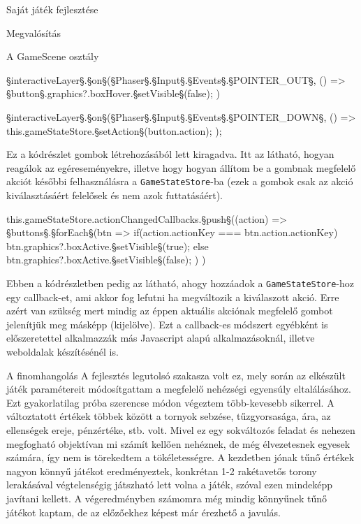 \begin{MyChapter}{Saját játék fejlesztése}
\begin{MySection}{Megvalósítás}
\begin{MySubSection}{A GameScene osztály}
\begin{javascript}
{	§\color{jsConst}interactiveLayer§.§\color{jsMethod}on§(§\color{jsType}Phaser§.§\color{jsType}Input§.§\color{jsType}Events§.§\color{jsConst}POINTER\_OUT§, () => {
		§\color{jsConst}button§.graphics?.boxHover.§\color{jsMethod}setVisible§(false);
	})
	
	§\color{jsConst}interactiveLayer§.§\color{jsMethod}on§(§\color{jsType}Phaser§.§\color{jsType}Input§.§\color{jsType}Events§.§\color{jsConst}POINTER\_DOWN§, () => {
		this.gameStateStore.§\color{jsMethod}setAction§(button.action);
	});
}
			\end{javascript}
			Ez a kódrészlet gombok létrehozásából lett kiragadva. Itt az látható, hogyan reagálok az egéreseményekre, illetve hogy hogyan állítom be a gombnak megfelelő akciót későbbi felhasználásra a \texttt{GameStateStore}-ba (ezek a gombok csak az akció kiválasztásáért felelősek és nem azok futtatásáért).
			\begin{javascript}
this.gameStateStore.actionChangedCallbacks.§\color{jsMethod}push§((action) => {
	§\color{jsConst}buttons§.§\color{jsMethod}forEach§(btn => {
		if(action.actionKey === btn.action.actionKey) {
			btn.graphics?.boxActive.§\color{jsMethod}setVisible§(true);
		} else {
			btn.graphics?.boxActive.§\color{jsMethod}setVisible§(false);
		}
	})
})
			\end{javascript}
			Ebben a kódrészletben pedig az látható, ahogy hozzáadok a \texttt{GameStateStore}-hoz egy callback-et, ami akkor fog lefutni ha megváltozik a kiválaszott akció. Erre azért van szükség mert mindig az éppen aktuális akciónak megfelelő gombot jelenítjük meg másképp (kijelölve). Ezt a callback-es módszert egyébként is előszeretettel alkalmazzák más Javascript alapú alkalmazásoknál, illetve weboldalak készítésénél is.
		\end{MySubSection}
		
		\begin{MySubSection}{A finomhangolás}
			A fejlesztés legutolsó szakasza volt ez, mely során az elkészült játék paramétereit módosítgattam a megfelelő nehézségi egyensúly eltalálásához. Ezt gyakorlatilag próba szerencse módon végeztem több-kevesebb sikerrel. A változtatott értékek többek között a tornyok sebzése, tűzgyorsasága, ára, az ellenségek ereje, pénzértéke, stb. volt. Mivel ez egy sokváltozós feladat és nehezen megfogható objektívan mi számít kellően nehéznek, de még élvezetesnek egyesek számára, így nem is törekedtem a tökéletességre.
			A kezdetben jónak tűnő értékek nagyon könnyű játékot eredményeztek, konkrétan 1-2 rakétavetős torony lerakásával végtelenségig játszható lett volna a játék, szóval ezen mindeképp javítani kellett. A végeredményben számomra még mindig könnyűnek tűnő játékot kaptam, de az előzőekhez képest már érezhető a javulás.
		\end{MySubSection}
			

\end{MySection}
\end{MyChapter}
